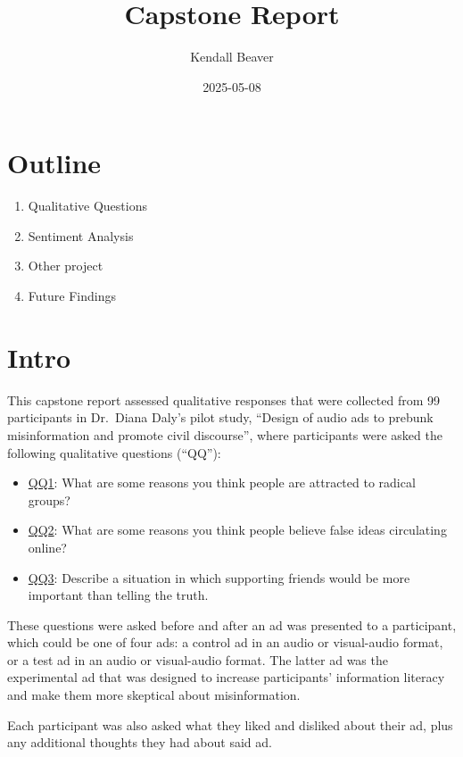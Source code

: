 \documentclass[
]{article}
\title{Capstone Report}
\author{Kendall Beaver}
\date{2025-05-08}
\providecommand{\tightlist}{%
  \setlength{\itemsep}{0pt}\setlength{\parskip}{0pt}}
\begin{document}
\maketitle

\section{Outline}\label{outline}

\begin{enumerate}
\def\labelenumi{\arabic{enumi}.}
\tightlist
\item
  Qualitative Questions
\item
  Sentiment Analysis
\item
  Other project
\item
  Future Findings
\end{enumerate}

\section{Intro}\label{intro}

This capstone report assessed qualitative responses that were collected
from 99 participants in Dr.~Diana Daly's pilot study, ``Design of audio
ads to prebunk misinformation and promote civil discourse'', where
participants were asked the following qualitative questions (``QQ''):

\begin{itemize}
\item
  \ul{QQ1}: What are some reasons you think people are attracted to
  radical groups?
\item
  \ul{QQ2}: What are some reasons you think people believe false ideas
  circulating online?
\item
  \ul{QQ3}: Describe a situation in which supporting friends would be
  more important than telling the truth.
\end{itemize}

These questions were asked before and after an ad was presented to a
participant, which could be one of four ads: a control ad in an audio or
visual-audio format, or a test ad in an audio or visual-audio format.
The latter ad was the experimental ad that was designed to increase
participants' information literacy and make them more skeptical about
misinformation.

Each participant was also asked what they liked and disliked about their
ad, plus any additional thoughts they had about said ad.
\end{document}
